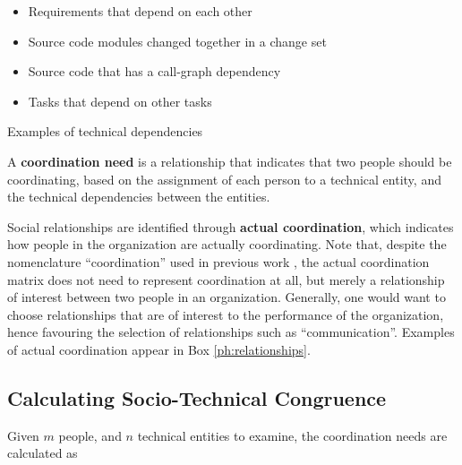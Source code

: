 \begin{placeholder}[t]
\begin{itemize}
\item Requirements that depend on each other~\cite{marczak2008:brokers,marczak2009:crossfunctional}
\item Source code modules changed together in a change set~\cite{cataldo2006:coordination_reqs,cataldo2008:stc}
\item Source code that has a call-graph dependency~\cite{deSouza2004:thwarts_collaboration}
\item Tasks that depend on other tasks \cite{wolf2009:mining}
\end{itemize}

\caption{Examples of technical dependencies}
\label{ph:technicalunits}
\end{placeholder}



A \textbf{coordination need} is a relationship that indicates that two people should be coordinating, based on the assignment of each person to a technical entity, and the technical dependencies between the entities.

Social relationships are identified through \textbf{actual coordination}, which indicates how people in the organization are actually coordinating. Note that, despite the nomenclature ``coordination'' used in previous work \cite{cataldo2006:coordination_reqs}, the actual coordination matrix does not need to represent coordination at all, but merely a relationship of interest between two people in an organization. Generally, one would want to choose relationships that are of interest to the performance of the organization, hence favouring the selection of relationships such as ``communication''. Examples of actual coordination appear in Box \ref{ph:relationships}.




\subsection{Calculating Socio-Technical Congruence}
\label{sec:stc}

Given $m$ people, and $n$ technical entities to examine, the coordination needs are calculated as 

